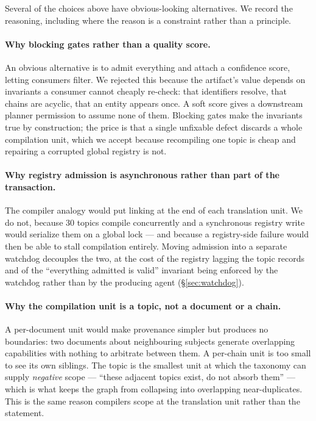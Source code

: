 \documentclass[10pt,a4paper]{article}
\begin{document}
Several of the choices above have obvious-looking alternatives. We record the
reasoning, including where the reason is a constraint rather than a principle.

\paragraph{Why blocking gates rather than a quality score.} An obvious
alternative is to admit everything and attach a confidence score, letting
consumers filter. We rejected this because the artifact's value depends on
invariants a consumer cannot cheaply re-check: that identifiers resolve, that
chains are acyclic, that an entity appears once. A soft score gives a downstream
planner permission to assume none of them. Blocking gates make the invariants
true by construction; the price is that a single unfixable defect discards a
whole compilation unit, which we accept because recompiling one topic is cheap
and repairing a corrupted global registry is not.

\paragraph{Why registry admission is asynchronous rather than part of the
transaction.} The compiler analogy would put linking at the end of each
translation unit. We do not, because 30 topics compile concurrently and a
synchronous registry write would serialize them on a global lock --- and because
a registry-side failure would then be able to stall compilation entirely. Moving
admission into a separate watchdog decouples the two, at the cost of the registry
lagging the topic records and of the ``everything admitted is valid'' invariant
being enforced by the watchdog rather than by the producing agent
(\S\ref{sec:watchdog}).

\paragraph{Why the compilation unit is a topic, not a document or a chain.} A
per-document unit would make provenance simpler but produces no boundaries: two
documents about neighbouring subjects generate overlapping capabilities with
nothing to arbitrate between them. A per-chain unit is too small to see its own
siblings. The topic is the smallest unit at which the taxonomy can supply
\emph{negative} scope --- ``these adjacent topics exist, do not absorb them'' ---
which is what keeps the graph from collapsing into overlapping near-duplicates.
This is the same reason compilers scope at the translation unit rather than the
statement.
\end{document}
